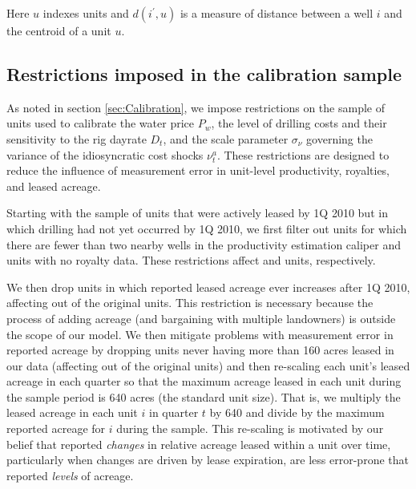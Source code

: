 \documentclass[12pt]{article}
\begin{document}
\noindent Here $u$ indexes units and $d(i^{\prime}, u)$ is a measure of distance between a well $i$ and the centroid of a unit $u$.

\subsection{Restrictions imposed in the calibration sample}

As noted in section \ref{sec:Calibration}, we impose restrictions on the sample of units used to calibrate the water price $P_w$, the level of drilling costs and their sensitivity to the rig dayrate $D_t$, and the scale parameter $\sigma_\nu$ governing the variance of the idiosyncratic cost shocks $\nu^a_t$. These restrictions are designed to reduce the influence of measurement error in unit-level productivity, royalties, and leased acreage.

Starting with the sample of units that were actively leased by 1Q 2010 but in which drilling had not yet occurred by 1Q 2010, we first filter out units for which there are fewer than two nearby wells in the productivity estimation caliper and units with no royalty data. These restrictions affect and units, respectively. 

We then drop units in which reported leased acreage ever increases after 1Q 2010, affecting out of the original units. This restriction is necessary because the process of adding acreage (and bargaining with multiple landowners) is outside the scope of our model. We then mitigate problems with measurement error in reported acreage by dropping units never having more than 160 acres leased in our data (affecting out of the original units) and then re-scaling each unit's leased acreage in each quarter so that the maximum acreage leased in each unit during the sample period is 640 acres (the standard unit size). That is, we multiply the leased acreage in each unit $i$ in quarter $t$ by 640 and divide by the maximum reported acreage for $i$ during the sample. This re-scaling is motivated by our belief that reported \emph{changes} in relative acreage leased within a unit over time, particularly when changes are driven by lease expiration, are less error-prone that reported \emph{levels} of acreage.
\end{document}
